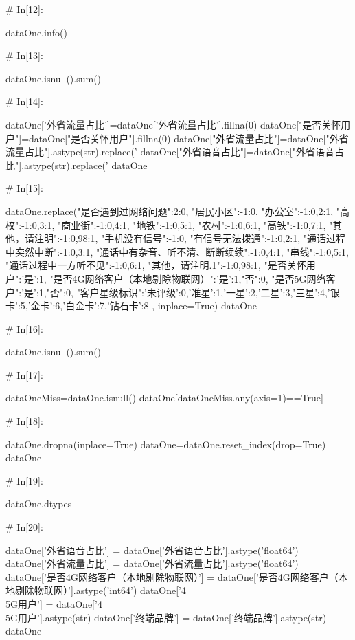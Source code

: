 \documentclass{MathorCupmodeling}
\begin{document}
\begin{python}
# In[12]:


dataOne.info()


# In[13]:


dataOne.isnull().sum()


# In[14]:


dataOne['外省流量占比']=dataOne['外省流量占比'].fillna(0)
dataOne["是否关怀用户"]=dataOne["是否关怀用户"].fillna(0)
dataOne["外省流量占比"]=dataOne["外省流量占比"].astype(str).replace('%
dataOne["外省语音占比"]=dataOne["外省语音占比"].astype(str).replace('%
dataOne


# In[15]:


dataOne.replace({"是否遇到过网络问题":{2:0},
                 "居民小区":{-1:0},
                 "办公室":{-1:0,2:1},
                 "高校":{-1:0,3:1},
                 "商业街":{-1:0,4:1},
                 "地铁":{-1:0,5:1},
                 "农村":{-1:0,6:1},
                 "高铁":{-1:0,7:1},
                 "其他，请注明":{-1:0,98:1},
                 "手机没有信号":{-1:0},
                 "有信号无法拨通":{-1:0,2:1},
                 "通话过程中突然中断":{-1:0,3:1},
                 "通话中有杂音、听不清、断断续续":{-1:0,4:1},
                 "串线":{-1:0,5:1},
                 "通话过程中一方听不见":{-1:0,6:1},
                 "其他，请注明.1":{-1:0,98:1},
                 "是否关怀用户":{'是':1},
                 "是否4G网络客户（本地剔除物联网）":{'是':1,"否":0},
                 "是否5G网络客户":{'是':1,"否":0},
                 "客户星级标识":{'未评级':0,'准星':1,'一星':2,'二星':3,'三星':4,'银卡':5,'金卡':6,'白金卡':7,'钻石卡':8}
                 }, inplace=True)
dataOne


# In[16]:


dataOne.isnull().sum()


# In[17]:


dataOneMiss=dataOne.isnull()
dataOne[dataOneMiss.any(axis=1)==True]


# In[18]:


dataOne.dropna(inplace=True)
dataOne=dataOne.reset_index(drop=True)
dataOne


# In[19]:


dataOne.dtypes


# In[20]:


dataOne['外省语音占比'] = dataOne['外省语音占比'].astype('float64')
dataOne['外省流量占比'] = dataOne['外省流量占比'].astype('float64')
dataOne['是否4G网络客户（本地剔除物联网）'] = dataOne['是否4G网络客户（本地剔除物联网）'].astype('int64')
dataOne['4\\5G用户'] = dataOne['4\\5G用户'].astype(str)
dataOne['终端品牌'] = dataOne['终端品牌'].astype(str)
dataOne



\end{python}
\end{document}
